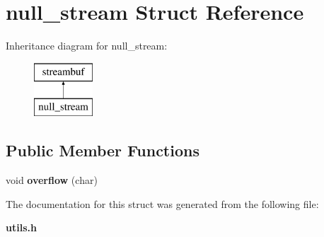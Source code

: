 \section{null\+\_\+stream Struct Reference}
\label{structnull__stream}
Inheritance diagram for null\+\_\+stream\+:\begin{figure}[H]
\begin{center}
\leavevmode
\includegraphics[height=2.000000cm]{structnull__stream}
\end{center}
\end{figure}
\subsection*{Public Member Functions}
\begin{DoxyCompactItemize}
\item 
\mbox{\label{structnull__stream_a0bbaf9ee51c3dbe2583d3f2c0dfaeefb}} 
void {\bfseries overflow} (char)
\end{DoxyCompactItemize}


The documentation for this struct was generated from the following file\+:\begin{DoxyCompactItemize}
\item 
\textbf{ utils.\+h}\end{DoxyCompactItemize}
